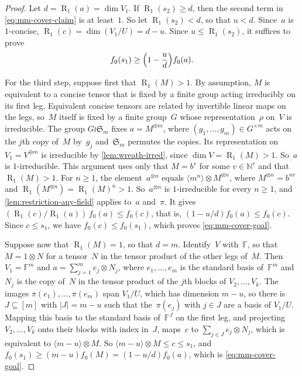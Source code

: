 \documentclass[11pt,letterpaper]{article}
\DeclareMathOperator{\tensorrank}{R}
\newcommand{\FF}{\mathbb{F}}
\newcommand{\NN}{\mathbb{N}}
\begin{document}
\begin{proof}
Let $d = \tensorrank_1(a) = \dim V_1$. If $\tensorrank_1(s_2) \geq d$, then the second term in \eqref{eq:mm-cover-claim} is at least~$1$. So let $\tensorrank_1(s_2) < d$, so that $u < d$. Since~$a$ is $1$-concise, $\tensorrank_1(c) = \dim(V_1/U) = d - u$. Since $u \leq \tensorrank_1(s_2)$, it suffices to prove
\begin{equation}\label{eq:mm-cover-goal}
f_0(s_1) \geq \Bigl(1 - \frac{u}{d}\Bigr) f_0(a).
\end{equation}

For the third step, suppose first that $\tensorrank_1(M) > 1$. By assumption, $M$ is equivalent to a concise tensor that is fixed by a finite group acting irreducibly on its first leg. Equivalent concise tensors are related by invertible linear maps on the legs, so~$M$ itself is fixed by a finite group~$G$ whose representation~$\rho$ on~$V$ is irreducible. The group $G \wr \mathfrak{S}_m$ fixes $a = M^{\oplus m}$, where $(g_1, \ldots, g_m) \in G^{\times m}$ acts on the $j$th copy of~$M$ by~$g_j$ and~$\mathfrak{S}_m$ permutes the copies. Its representation on $V_1 = V^{\oplus m}$ is irreducible by \cref{lem:wreath-irred}, since $\dim V = \tensorrank_1(M) > 1$. So~$a$ is $1$-irreducible. This argument uses only that $M = b^v$ for some $v \in \NN^r$ and that $\tensorrank_1(M) > 1$. For $n \geq 1$, the element~$a^{\otimes n}$ equals $\langle m^n \rangle \otimes M^{\otimes n}$, where $M^{\otimes n} = b^{nv}$ and $\tensorrank_1(M^{\otimes n}) = \tensorrank_1(M)^n > 1$. So~$a^{\otimes n}$ is $1$-irreducible for every $n \geq 1$, and \cref{lem:restriction-any-field} applies to~$a$ and~$\pi$. It gives $(\tensorrank_1(c)/\tensorrank_1(a))\, f_0(a) \leq f_0(c)$, that is, $(1 - u/d) f_0(a) \leq f_0(c)$. Since $c \leq s_1$, we have $f_0(c) \leq f_0(s_1)$, which proves \eqref{eq:mm-cover-goal}.

Suppose now that $\tensorrank_1(M) = 1$, so that $d = m$. Identify~$V$ with~$\FF$, so that $M = 1 \otimes N$ for a tensor~$N$ in the tensor product of the other legs of~$M$. Then $V_1 = \FF^m$ and $a = \sum_{j=1}^m e_j \otimes N_j$, where $e_1, \ldots, e_m$ is the standard basis of~$\FF^m$ and~$N_j$ is the copy of~$N$ in the tensor product of the $j$th blocks of $V_2, \ldots, V_k$. The images $\pi(e_1), \ldots, \pi(e_m)$ span $V_1/U$, which has dimension $m - u$, so there is $J \subseteq [m]$ with $|J| = m - u$ such that the~$\pi(e_j)$ with $j \in J$ are a basis of $V_1/U$. Mapping this basis to the standard basis of~$\FF^J$ on the first leg, and projecting $V_2, \ldots, V_k$ onto their blocks with index in~$J$, maps~$c$ to $\sum_{j \in J} e_j \otimes N_j$, which is equivalent to $\langle m-u \rangle \otimes M$. So $\langle m-u \rangle \otimes M \leq c \leq s_1$, and $f_0(s_1) \geq (m-u) f_0(M) = (1 - u/d) f_0(a)$, which is \eqref{eq:mm-cover-goal}.
\end{proof}
\end{document}
